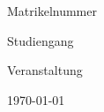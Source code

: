 \begin{titlepage}
	\begin{center}
		{\scshape\Large \TypDerArbeit\par}
	\vspace{0.5cm}
		{\huge\bfseries\TitelDerArbeit\par}

	\vspace{0.5cm}
	{\Aufgabe\par}
	\vspace{0.5cm}
	\vfill
	
	{\Large\itshape 
		{\StudentName}\par
		Matrikelnummer {\Matrikelnummer}\par
		{\StudentMail}\par
	}
	\vfill
	Studiengang\par
	\textsc{\Studiengang}\par
	Veranstaltung\par
	 \textsc{\Veranstaltung}\par
	\DozentIn\par
	\vspace*{\fill}
	{\large \today\par}
	\end{center}
\end{titlepage}

